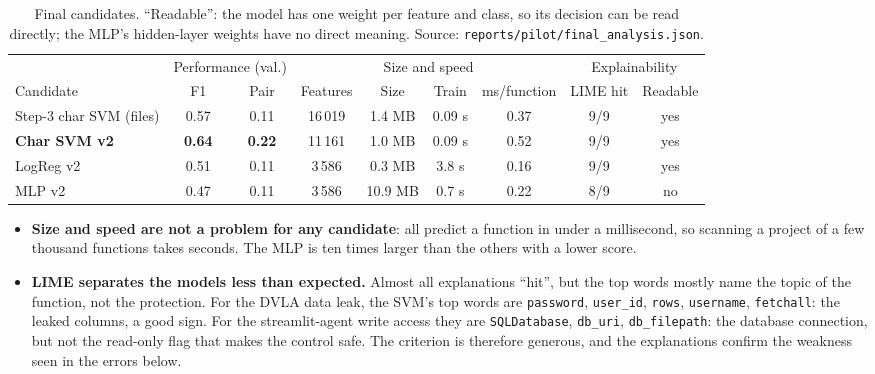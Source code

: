 \documentclass[11pt,a4paper]{article}
\newcommand{\code}[1]{\texttt{#1}}
\begin{document}
\begin{table}[H]
\centering\footnotesize\setlength{\tabcolsep}{4pt}
\begin{tabular}{@{}lcccccccc@{}}
\toprule
& \multicolumn{2}{c}{Performance (val.)} & \multicolumn{4}{c}{Size and speed} & \multicolumn{2}{c}{Explainability} \\
\cmidrule(lr){2-3}\cmidrule(lr){4-7}\cmidrule(lr){8-9}
Candidate & F1 & Pair & Features & Size & Train & ms/function & LIME hit & Readable \\
\midrule
Step-3 char SVM (files) & 0.57 & 0.11 & 16\,019 & 1.4 MB & 0.09 s & 0.37 & 9/9 & yes \\
\textbf{Char SVM v2} & \textbf{0.64} & \textbf{0.22} & 11\,161 & 1.0 MB & 0.09 s & 0.52 & 9/9 & yes \\
LogReg v2 & 0.51 & 0.11 & 3\,586 & 0.3 MB & 3.8 s & 0.16 & 9/9 & yes \\
MLP v2 & 0.47 & 0.11 & 3\,586 & 10.9 MB & 0.7 s & 0.22 & 8/9 & no \\
\bottomrule
\end{tabular}
\caption{Final candidates. ``Readable'': the model has one weight per feature and class, so
its decision can be read directly; the MLP's hidden-layer weights have no direct meaning.
Source: \code{reports/pilot/final\_analysis.json}.}
\label{tab:criteria}
\end{table}

\begin{itemize}
  \item \textbf{Size and speed are not a problem for any candidate}: all predict a function
        in under a millisecond, so scanning a project of a few thousand functions takes
        seconds. The MLP is ten times larger than the others with a lower score.
  \item \textbf{LIME separates the models less than expected.} Almost all explanations
        ``hit'', but the top words mostly name the topic of the function, not the
        protection. For the DVLA data leak, the SVM's top words are \code{password},
        \code{user\_id}, \code{rows}, \code{username}, \code{fetchall}: the leaked columns, a
        good sign. For the streamlit-agent write access they are \code{SQLDatabase},
        \code{db\_uri}, \code{db\_filepath}: the database connection, but not the read-only
        flag that makes the control safe. The criterion is therefore generous, and the
        explanations confirm the weakness seen in the errors below.
\end{itemize}
\end{document}
